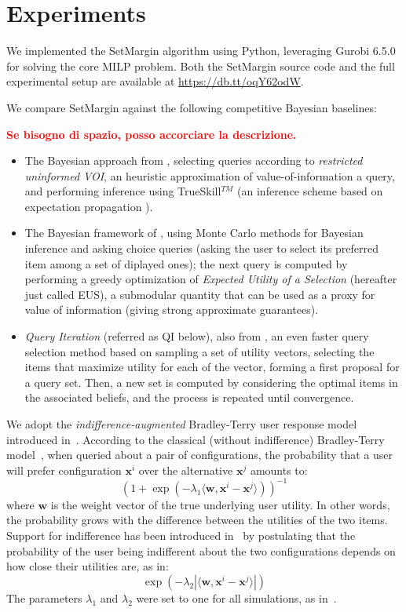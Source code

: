 \documentclass{article}
\renewcommand\[{\begin{equation}}
\renewcommand\]{\end{equation}}
\newcommand{\vecvar}[1]{\ensuremath{\boldsymbol{#1}}}
\newcommand{\vw}{\vecvar{w}}
\newcommand{\vx}{\vecvar{x}}
\newcommand{\paolo}[1]{{\bf \textcolor{red}{{\fbox{Paolo:} #1}}}}
\begin{document}
\section{Experiments}
\label{sec:experiments}

We implemented the {\sc SetMargin} algorithm using Python, leveraging Gurobi
6.5.0 for solving the core MILP problem. Both the {\sc SetMargin} source code
and the full experimental setup are available at \url{https://db.tt/oqY62odW}.

We compare {\sc SetMargin} against the following competitive Bayesian baselines:


\paolo{Se bisogno di spazio, posso accorciare la descrizione.}
\begin{itemize}
 \item The Bayesian approach from \cite{guo2010real}, selecting queries according to 
 {\em restricted uninformed VOI}, an heuristic approximation of value-of-information a query, and performing inference using  TrueSkill$^{TM}$ \cite{HerbrichMG06} (an inference scheme based on expectation propagation \cite{Minka01}).
 \item The Bayesian framework of \cite{viappiani2010optimal}, using Monte Carlo methods for Bayesian inference and asking choice queries (asking the user to select its preferred item among a set of diplayed ones); the next query is computed by performing a greedy optimization of {\em Expected Utility of a Selection} (hereafter just called EUS), a submodular quantity that can be used as a proxy for value of information (giving strong approximate guarantees).
 \item {\em Query Iteration} (referred as QI below), also from \cite{viappiani2010optimal}, an even faster query selection method based on sampling a set of utility vectors, selecting the items that maximize utility for each of the vector, forming a first proposal for a query set. Then, a new set is computed by considering the optimal items in the associated  beliefs, and the process is repeated until convergence.
\end{itemize}


We adopt the {\em indifference-augmented} Bradley-Terry user response
model introduced in~\cite{guo2010real}. According to the classical
(without indifference) Bradley-Terry model~\cite{BraTer52}, when queried about a pair
of configurations, the probability that a user will prefer
configuration $\vx^i$ over the alternative $\vx^j$ amounts to:
%
$$ (1 + \exp(-\lambda_1 \langle\vw,\vx^i - \vx^j\rangle))^{-1} $$
%
where $\vw$ is the weight vector of the true underlying user utility.
In other words, the probability grows with the difference between the
utilities of the two items. Support for indifference has been
introduced in~\cite{guo2010real} by postulating that the probability
of the user being indifferent about the two configurations depends on
how close their utilities are, as in:
%
$$ \exp(-\lambda_2 |\langle\vw,\vx^i - \vx^j\rangle|) $$
%
The parameters $\lambda_1$ and $\lambda_2$ were set to one for all
simulations, as in~\cite{guo2010real}.
\end{document}
